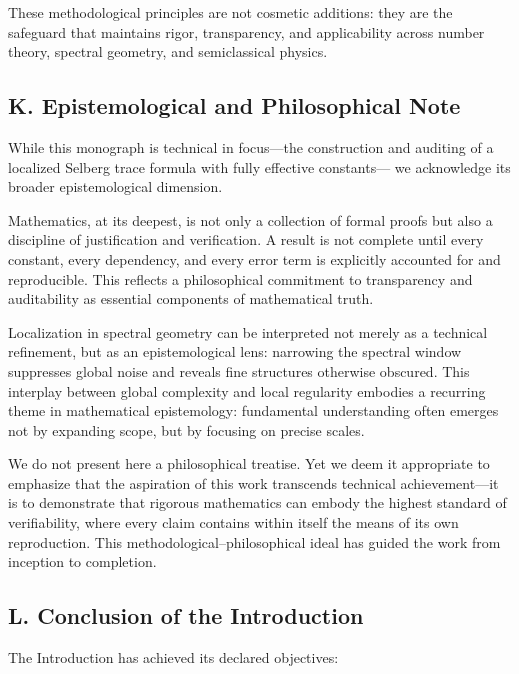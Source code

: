 These methodological principles are not cosmetic additions:
they are the safeguard that maintains rigor, transparency,
and applicability across number theory, spectral geometry, and semiclassical physics.

\subsection*{K. Epistemological and Philosophical Note}

While this monograph is technical in focus—the construction and auditing
of a localized Selberg trace formula with fully effective constants—
we acknowledge its broader epistemological dimension.

Mathematics, at its deepest, is not only a collection of formal proofs
but also a discipline of justification and verification.
A result is not complete until every constant, every dependency,
and every error term is explicitly accounted for and reproducible.
This reflects a philosophical commitment to transparency and auditability
as essential components of mathematical truth.

Localization in spectral geometry can be interpreted not merely as a technical refinement,
but as an epistemological lens: narrowing the spectral window suppresses global noise
and reveals fine structures otherwise obscured.
This interplay between global complexity and local regularity
embodies a recurring theme in mathematical epistemology:
fundamental understanding often emerges not by expanding scope,
but by focusing on precise scales.

We do not present here a philosophical treatise.
Yet we deem it appropriate to emphasize that the aspiration of this work
transcends technical achievement—it is to demonstrate
that rigorous mathematics can embody the highest standard of verifiability,
where every claim contains within itself the means of its own reproduction.
This methodological–philosophical ideal has guided the work from inception to completion.

\subsection*{L. Conclusion of the Introduction}

The Introduction has achieved its declared objectives:


